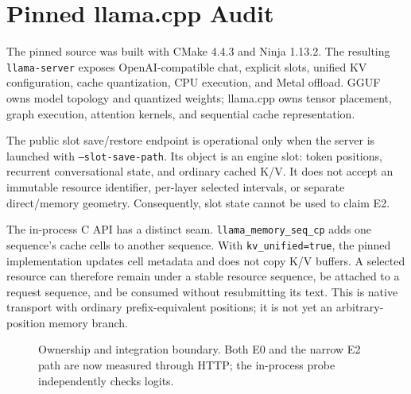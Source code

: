 \documentclass[10pt]{article}
\begin{document}
\section{Pinned llama.cpp Audit}
The pinned source was built with CMake 4.4.3 and Ninja 1.13.2. The resulting
\texttt{llama-server} exposes OpenAI-compatible chat, explicit slots, unified KV
configuration, cache quantization, CPU execution, and Metal offload. GGUF owns
model topology and quantized weights; llama.cpp owns tensor placement, graph
execution, attention kernels, and sequential cache representation.

The public slot save/restore endpoint is operational only when the
server is launched with \texttt{--slot-save-path}. Its object is an engine slot:
token positions, recurrent conversational state, and ordinary cached K/V. It
does not accept an immutable resource identifier, per-layer selected intervals,
or separate direct/memory geometry. Consequently, slot state cannot be used to
claim E2.

The in-process C API has a distinct seam. \texttt{llama\_memory\_seq\_cp}
adds one sequence's cache cells to another sequence. With
\texttt{kv\_unified=true}, the pinned implementation updates cell metadata and
does not copy K/V buffers. A selected resource can therefore remain under a
stable resource sequence, be attached to a request sequence, and be consumed
without resubmitting its text. This is native transport with ordinary
prefix-equivalent positions; it is not yet an arbitrary-position memory branch.

\begin{figure}[t]
\centering
{}
\caption{Ownership and integration boundary. Both E0 and the narrow E2 path
are now measured through HTTP; the in-process probe independently checks logits.}
\label{fig:architecture}
\end{figure}
\end{document}
